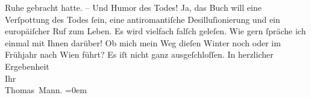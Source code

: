 \begin{ledgroupsized}[t]{13cm}
                    Ruhe gebracht hatte. – Und Humor des Todes! Ja, das Buch will eine Verſpot{\pb}tung des Todes ſein, eine
                    antiromantiſche Desilluſionierung und ein europäiſcher Ruf zum Leben. Es wird vielfach falſch geleſen.\pend
           \pstart
           Wie gern ſpräche ich einmal mit Ihnen darüber! Ob mich mein Weg dieſen Winter
                    noch oder im Frühjahr nach Wien führt? Es iſt
                    nicht ganz ausgeſchloſſen.\pend
           \pstart
           In herzlicher Ergebenheit{\\[\baselineskip]}Ihr{\\[\baselineskip]}\spacefill\mbox{Thomas Mann.}\pend
           \leftskip=0em{}
         
         \endnumbering{}\end{ledgroupsized}  \newcommand{\dateiname}{L02430}\newcommand{\titel}{Thomas Mann an Arthur Schnitzler, 9. 1. 1925}\newcommand{\editorInnen}{Martin Anton Müller und Gerd-Hermann Susen}
      
